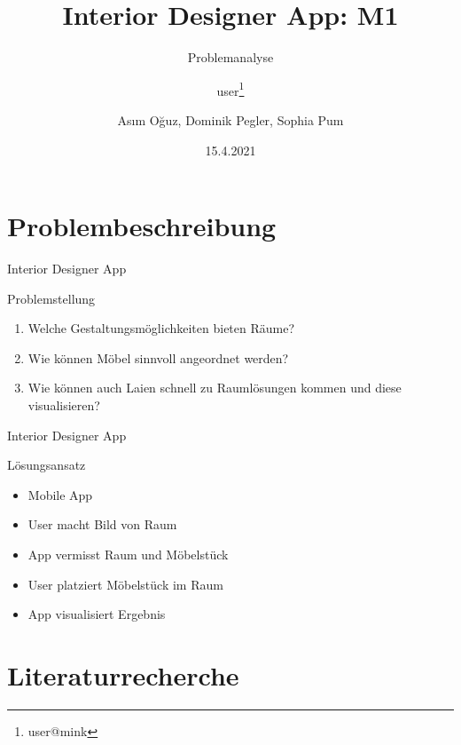 \documentclass[presentation,bigger,aspectratio=169]{beamer}
\author{user\thanks{user@mink}}
\date{15.4.2021}
\title{Interior Designer App: M1}
\subtitle{Problemanalyse}
\author[A.Oğuz, D.Pegler, S.Pum]{Asım Oğuz, Dominik Pegler, Sophia Pum}
\institute{Universität Wien, Fakultät für Informatik (SS2021)}
\begin{document}
\maketitle

\section{Problembeschreibung}
\label{sec:org3e655d0}
\begin{frame}[label={sec:org0d9b9c3}]{\vspace{2.2cm}\begin{center}\MakeUppercase{\insertsection}\end{center}}
\end{frame}

\begin{frame}[label={sec:orgc03ec03}]{Interior Designer App}
\begin{block}{Problemstellung}
\begin{enumerate}
\item Welche Gestaltungsmöglichkeiten bieten Räume?
\item Wie können Möbel sinnvoll angeordnet werden?
\item Wie können auch Laien schnell zu Raumlösungen kommen und diese
visualisieren?
\end{enumerate}
\end{block}
\end{frame}
\begin{frame}[label={sec:org1e3a974}]{Interior Designer App}
\begin{block}{Lösungsansatz}
\begin{itemize}
\item Mobile App
\item User macht Bild von Raum
\item App vermisst Raum und Möbelstück
\item User platziert Möbelstück im Raum
\item App visualisiert Ergebnis
\end{itemize}
\end{block}
\end{frame}

\section{Literaturrecherche}
\label{sec:org68eb3a5}
\begin{frame}[label={sec:org7476519}]{\vspace{2.2cm}\begin{center}\MakeUppercase{\insertsection}\end{center}}
\end{frame}
\end{document}
